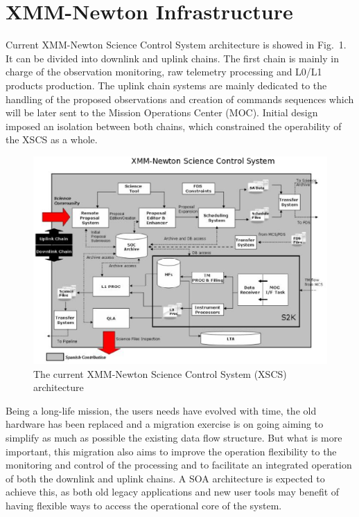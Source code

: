 \section{XMM-Newton Infrastructure}
Current XMM-Newton Science Control System architecture is showed in Fig.~1. It can be divided into 
downlink and uplink chains. The first chain is mainly in charge of the observation monitoring, raw telemetry processing and L0/L1 products production. \cite{vallejo11}
The uplink chain systems are mainly dedicated to the handling of the proposed observations and creation of
commands sequences which will be later sent to the Mission Operations Center (MOC).
Initial design imposed an isolation between both chains, which constrained the operability of the XSCS as a whole. 
\begin{figure}[h]
\centering
\includegraphics[width=80 mm]{part10/Perez_P022/P022_f1.eps}
\caption{The current XMM-Newton Science Control System (XSCS) architecture}
\label{fig:1}
\end{figure}
Being a long-life mission, the users needs have evolved with time, 
the old hardware has been replaced and a migration exercise is on going aiming
to simplify as much as possible the existing data flow structure. But what is more important,
this migration also aims to improve the operation flexibility to the monitoring and control of the processing
and to facilitate an integrated operation of both the downlink and uplink chains. A SOA architecture
is expected to achieve this, as both old legacy applications and new user tools may benefit of
having flexible ways to access the operational core of the system.
